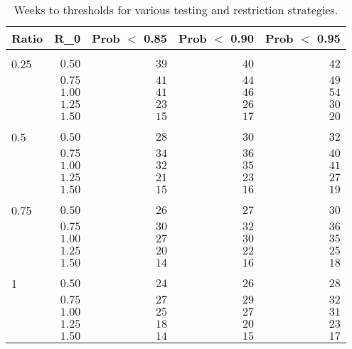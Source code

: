 \begin{table}[tb]
\caption{Weeks to thresholds for various testing and restriction strategies.\label{tab:intervention}} 
\begin{center}
\begin{tabular}{lrrrr}
\hline\hline
\multicolumn{1}{c}{Ratio}&\multicolumn{1}{c}{R_0}&\multicolumn{1}{c}{Prob $<$ 0.85}&\multicolumn{1}{c}{Prob $<$ 0.90}&\multicolumn{1}{c}{Prob $<$ 0.95}\tabularnewline
\hline
&&&&\tabularnewline
0.25&$0.50$&$39$&$40$&$42$\tabularnewline
 &$0.75$&$41$&$44$&$49$\tabularnewline
 &$1.00$&$41$&$46$&$54$\tabularnewline
 &$1.25$&$23$&$26$&$30$\tabularnewline
 &$1.50$&$15$&$17$&$20$\tabularnewline
\hline
&&&&\tabularnewline
0.5&$0.50$&$28$&$30$&$32$\tabularnewline
 &$0.75$&$34$&$36$&$40$\tabularnewline
 &$1.00$&$32$&$35$&$41$\tabularnewline
 &$1.25$&$21$&$23$&$27$\tabularnewline
 &$1.50$&$15$&$16$&$19$\tabularnewline
\hline
&&&&\tabularnewline
0.75&$0.50$&$26$&$27$&$30$\tabularnewline
 &$0.75$&$30$&$32$&$36$\tabularnewline
 &$1.00$&$27$&$30$&$35$\tabularnewline
 &$1.25$&$20$&$22$&$25$\tabularnewline
 &$1.50$&$14$&$16$&$18$\tabularnewline
\hline
&&&&\tabularnewline
1&$0.50$&$24$&$26$&$28$\tabularnewline
 &$0.75$&$27$&$29$&$32$\tabularnewline
 &$1.00$&$25$&$27$&$31$\tabularnewline
 &$1.25$&$18$&$20$&$23$\tabularnewline
 &$1.50$&$14$&$15$&$17$\tabularnewline
\hline
\end{tabular}\end{center}
\end{table}
